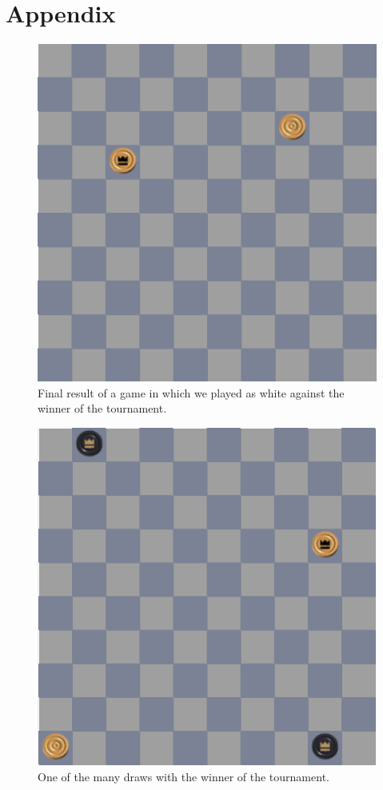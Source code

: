 \documentclass[11pt,a4paper]{article}
\begin{document}
\section{Appendix}
\begin{figure}[h!]
\centering
\includegraphics{win_with_42.png}
\caption{Final result of a game in which we played as white against the winner of the tournament.}
\label{fig:win42}
\end{figure}
\begin{figure}[h!]
\centering
\includegraphics{draw_with_42.png}
\caption{One of the many draws with the winner of the tournament.}
\label{fig:draw42}
\end{figure}
\end{document}
